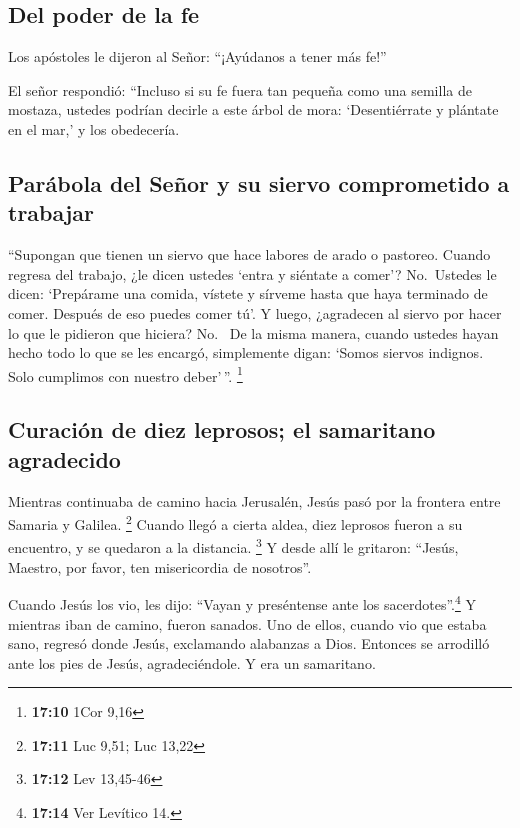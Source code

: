 \hypertarget{del-poder-de-la-fe}{%
\subsection{Del poder de la fe}\label{del-poder-de-la-fe}}

 Los apóstoles le dijeron al Señor: ``¡Ayúdanos a tener
más fe!''

 El señor respondió: ``Incluso si su fe fuera tan pequeña
como una semilla de mostaza, ustedes podrían decirle a este árbol de
mora: `Desentiérrate y plántate en el mar,' y los obedecería.

\hypertarget{paruxe1bola-del-seuxf1or-y-su-siervo-comprometido-a-trabajar}{%
\subsection{Parábola del Señor y su siervo comprometido a
trabajar}\label{paruxe1bola-del-seuxf1or-y-su-siervo-comprometido-a-trabajar}}

 ``Supongan que tienen un siervo que hace labores de arado
o pastoreo. Cuando regresa del trabajo, ¿le dicen ustedes `entra y
siéntate a comer'?  No.~Ustedes le dicen: `Prepárame una
comida, vístete y sírveme hasta que haya terminado de comer. Después de
eso puedes comer tú'.  Y luego, ¿agradecen al siervo por
hacer lo que le pidieron que hiciera? No.~ De la misma
manera, cuando ustedes hayan hecho todo lo que se les encargó,
simplemente digan: `Somos siervos indignos. Solo cumplimos con nuestro
deber'\,''. \footnote{\textbf{17:10} 1Cor 9,16}

\hypertarget{curaciuxf3n-de-diez-leprosos-el-samaritano-agradecido}{%
\subsection{Curación de diez leprosos; el samaritano
agradecido}\label{curaciuxf3n-de-diez-leprosos-el-samaritano-agradecido}}

 Mientras continuaba de camino hacia Jerusalén, Jesús
pasó por la frontera entre Samaria y Galilea. \footnote{\textbf{17:11}
  Luc 9,51; Luc 13,22}  Cuando llegó a cierta aldea, diez
leprosos fueron a su encuentro, y se quedaron a la distancia.
\footnote{\textbf{17:12} Lev 13,45-46}  Y desde allí le
gritaron: ``Jesús, Maestro, por favor, ten misericordia de nosotros''.

 Cuando Jesús los vio, les dijo: ``Vayan y preséntense
ante los sacerdotes''.\footnote{\textbf{17:14} Ver Levítico 14.} Y
mientras iban de camino, fueron sanados.  Uno de ellos,
cuando vio que estaba sano, regresó donde Jesús, exclamando alabanzas a
Dios.  Entonces se arrodilló ante los pies de Jesús,
agradeciéndole. Y era un samaritano.

